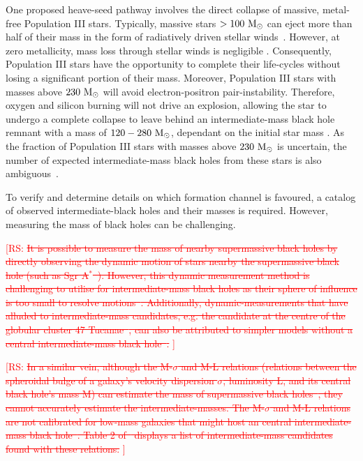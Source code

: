 \documentclass[%
 nofootinbib,
 amsmath,amssymb,
 aps,
 twocolumn
]{revtex4-2}
\newcommand{\mathcmd}[1]{{\sc \relax\ifmmode#1\else $#1$\fi}\xspace}
\newcommand{\msun}{\mathcmd{\text{M}_\odot}}
\newcommand{\rs}[1]{\textcolor{red}{[RS: #1]}}
\begin{document}
One proposed heave-seed pathway involves the direct collapse of massive, metal-free Population III stars. Typically, massive stars $> 100 \ \msun$ can eject more than half of their mass in the form of radiatively driven stellar winds~\cite{}. However, at zero metallicity, mass loss through stellar winds is negligible \cite{Kudritzki 2000}. Consequently,  Population III stars have the opportunity to complete their life-cycles without losing a significant portion of their mass. Moreover, Population III stars with masses above $230 \ \msun$ will avoid electron-positron pair-instability. Therefore, oxygen and silicon burning will not drive an explosion, allowing the star to undergo a complete collapse to leave behind an intermediate-mass black hole remnant with a mass of $120-280 \ \msun$, dependant on the initial star mass \cite{Bond et al. 1984}. As the fraction of Population III stars with masses above $230 \ \msun$ is uncertain, the number of expected intermediate-mass black holes from these stars is also ambiguous~\cite{Coleman Miller, Formation Scenarios for Intermediate-Mass Black Holes}.  

To verify and determine details on which formation channel is favoured, a catalog of observed intermediate-black holes and their masses is required. However, measuring the mass of black holes can be challenging. 

\rs{\sout{It is possible to measure the mass of nearby supermassive black holes by directly observing the dynamic motion of stars nearby the supermassive black hole (such as Sgr A$^*$~). However, this dynamic measurement method is challenging to utilise for  intermediate-mass black holes as their sphere of influence is too small to resolve motions~\cite{}. Additionally, dynamic-measurements that have alluded to  intermediate-mass candidates, e.g. the candidate at the centre of the globular cluster 47 Tucanae~\cite{kiziltan 2017}, can also be attributed to simpler models without a central  intermediate-mass black hole~\cite{freire 2017}. }}

\rs{\sout{In a similar vein, although the M-$\sigma$ and M-L relations (relations between the spheroidal bulge of a galaxy's velocity dispersion $\sigma$,  luminosity L, and its central black hole's mass M) can estimate the mass of supermassive black holes~\cite{Ferrarese & Merritt 2000 and Gebhardt et al. 2000}, they cannot accurately estimate the intermediate-masses. The M-$\sigma$ and M-L relations are not calibrated for low-mass galaxies that might host an central intermediate-mass black hole~\cite{J. E. Greene and L. C. Ho The Mass Function of Active Black Holes in the Local Universe, E. C. Moran, K. Shahinyan, H. R. Sugarman, D. O. Vélez and M. Eracleous Black Holes At the Centers of Nearby Dwarf Galaxies}. Table 2 of~\citet{mercuza} displays a list of intermediate-mass candidates found with these relations. }}
\end{document}
